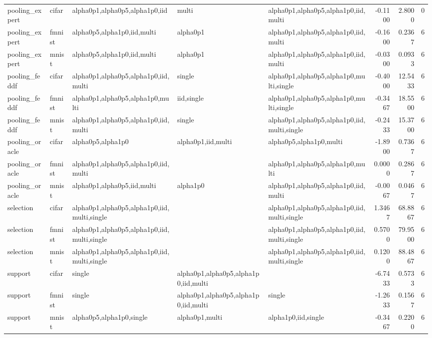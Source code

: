 \begin{tabular}{lllllrrr}
pooling\_expert & cifar & alpha0p1,alpha0p5,alpha1p0,iid & multi & alpha0p1,alpha0p5,alpha1p0,iid,multi & -0.1100 & 2.8000 & 0 \\
pooling\_expert & fmnist & alpha0p5,alpha1p0,iid,multi & alpha0p1 & alpha0p1,alpha0p5,alpha1p0,iid,multi & -0.1600 & 0.2367 & 6 \\
pooling\_expert & mnist & alpha0p5,alpha1p0,iid,multi & alpha0p1 & alpha0p1,alpha0p5,alpha1p0,iid,multi & -0.0300 & 0.0933 & 6 \\
pooling\_feddf & cifar & alpha0p1,alpha0p5,alpha1p0,iid,multi & single & alpha0p1,alpha0p5,alpha1p0,multi,single & -0.4000 & 12.5433 & 6 \\
pooling\_feddf & fmnist & alpha0p1,alpha0p5,alpha1p0,multi & iid,single & alpha0p1,alpha0p5,alpha1p0,multi,single & -0.3467 & 18.5500 & 6 \\
pooling\_feddf & mnist & alpha0p1,alpha0p5,alpha1p0,iid,multi & single & alpha0p1,alpha0p5,alpha1p0,iid,multi,single & -0.2433 & 15.3700 & 6 \\
pooling\_oracle & cifar & alpha0p5,alpha1p0 & alpha0p1,iid,multi & alpha0p5,alpha1p0,multi & -1.8900 & 0.7367 & 6 \\
pooling\_oracle & fmnist & alpha0p1,alpha0p5,alpha1p0,iid,multi &  & alpha0p1,alpha0p5,alpha1p0,multi & 0.0000 & 0.2867 & 6 \\
pooling\_oracle & mnist & alpha0p1,alpha0p5,iid,multi & alpha1p0 & alpha0p1,alpha0p5,alpha1p0,iid,multi & -0.0067 & 0.0467 & 6 \\
selection & cifar & alpha0p1,alpha0p5,alpha1p0,iid,multi,single &  & alpha0p1,alpha0p5,alpha1p0,iid,multi,single & 1.3467 & 68.8867 & 6 \\
selection & fmnist & alpha0p1,alpha0p5,alpha1p0,iid,multi,single &  & alpha0p1,alpha0p5,alpha1p0,iid,multi,single & 0.5700 & 79.9500 & 6 \\
selection & mnist & alpha0p1,alpha0p5,alpha1p0,iid,multi,single &  & alpha0p1,alpha0p5,alpha1p0,iid,multi,single & 0.1200 & 88.4867 & 6 \\
support & cifar & single & alpha0p1,alpha0p5,alpha1p0,iid,multi &  & -6.7433 & 0.5733 & 6 \\
support & fmnist & single & alpha0p1,alpha0p5,alpha1p0,iid,multi & single & -1.2633 & 0.1567 & 6 \\
support & mnist & alpha0p5,alpha1p0,single & alpha0p1,multi & alpha1p0,iid,single & -0.3467 & 0.2200 & 6 \\
\bottomrule
\end{tabular}

